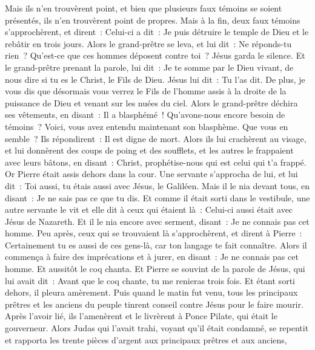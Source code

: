 \begin{multicols}{2}
Mais ils n'en trouvèrent point, et bien que plusieurs faux témoins se soient présentés, ils n'en trouvèrent point de propres. Mais à la fin, deux faux témoins s'approchèrent,
et dirent~: Celui-ci a dit~: Je puis détruire le temple de Dieu et le rebâtir en trois jours.
Alors le grand-prêtre se leva, et lui dit~: Ne réponds-tu rien~? Qu'est-ce que ces hommes déposent contre toi~?
Jésus garda le silence. Et le grand-prêtre prenant la parole, lui dit~: Je te somme par le Dieu vivant, de nous dire si tu es le Christ, le Fils de Dieu.
Jésus lui dit~: Tu l'as dit. De plus, je vous dis que désormais vous verrez le Fils de l'homme assis à la droite de la puissance de Dieu et venant sur les nuées du ciel.
Alors le grand-prêtre déchira ses vêtements, en disant~: Il a blasphémé~! Qu'avons-nous encore besoin de témoins~? Voici, vous avez entendu maintenant son blasphème. Que vous en semble~?
Ils répondirent~: Il est digne de mort.
Alors ils lui crachèrent au visage, et lui donnèrent des coups de poing et des soufflets, et les autres le frappaient avec leurs bâtons,
en disant~: Christ, prophétise-nous qui est celui qui t'a frappé.
Or Pierre était assis dehors dans la cour. Une servante s'approcha de lui, et lui dit~: Toi aussi, tu étais aussi avec Jésus, le Galiléen.
Mais il le nia devant tous, en disant~: Je ne sais pas ce que tu dis.
Et comme il était sorti dans le vestibule, une autre servante le vit et elle dit à ceux qui étaient là~: Celui-ci aussi était avec Jésus de Nazareth.
Et il le nia encore avec serment, disant~: Je ne connais pas cet homme.
Peu après, ceux qui se trouvaient là s'approchèrent, et dirent à Pierre~: Certainement tu es aussi de ces gens-là, car ton langage te fait connaître.
Alors il commença à faire des imprécations et à jurer, en disant~: Je ne connais pas cet homme. Et aussitôt le coq chanta.
Et Pierre se souvint de la parole de Jésus, qui lui avait dit~: Avant que le coq chante, tu me renieras trois fois. Et étant sorti dehors, il pleura amèrement.
\VerseOne{}Puis quand le matin fut venu, tous les principaux prêtres et les anciens du peuple tinrent conseil contre Jésus pour le faire mourir.
Après l'avoir lié, ils l'amenèrent et le livrèrent à Ponce Pilate, qui était le gouverneur.
Alors Judas qui l'avait trahi, voyant qu'il était condamné, se repentit et rapporta les trente pièces d'argent aux principaux prêtres et aux anciens,

\end{multicols}

